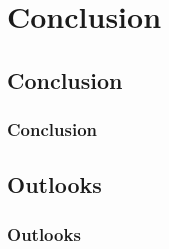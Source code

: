 \section{Conclusion}

\subsection{Conclusion}
\begin{frame}
  \frametitle{Conclusion}
\end{frame}

\subsection{Outlooks}
\begin{frame}
  \frametitle{Outlooks}
\end{frame}